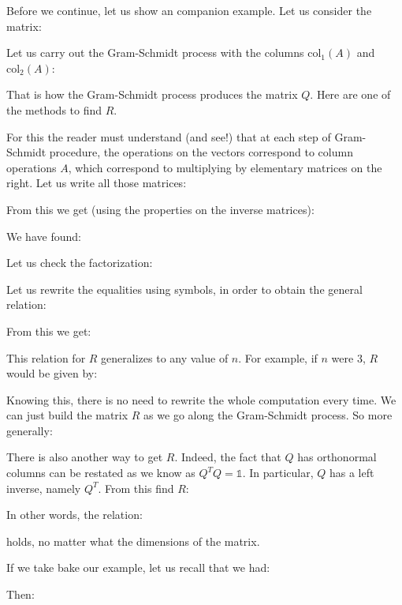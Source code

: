 	Before we continue, let us show an companion example. Let us consider the matrix:
	
	Let us carry out the Gram-Schmidt process with the columns $\text{col}_1(A)$ and $\text{col}_2(A)$:
	
	That is how the Gram-Schmidt process produces the matrix $Q$. Here are one of the methods to find $R$.
	
	For this the reader must understand (and see!) that at each step of Gram-Schmidt procedure, the operations on the vectors correspond to column operations $A$, which correspond to multiplying by elementary matrices on the right. Let us write all those matrices:
	
	From this we get (using the properties on the inverse matrices):
	
	We have found:
	
	Let us check the factorization:
	
	Let us rewrite the equalities using symbols, in order to obtain the general relation:
	
	From this we get:
	
	This relation for $R$ generalizes to any value of $n$. For example, if $n$ were $3$, $R$ would be given
by:
	
	Knowing this, there is no need to rewrite the whole computation every time. We can just
build the matrix $R$ as we go along the Gram-Schmidt process. So more generally:
	

	There is also another way to get $R$.  Indeed, the fact that $Q$ has orthonormal columns can be restated as we know as $Q^TQ=\mathds{1}$. In particular, $Q$ has a left inverse, namely $Q^T$. From this find $R$:
	
	In other words, the relation:
	
	holds, no matter what the dimensions of the matrix.
	
	If we take bake our example, let us recall that we had:
	
	Then:
	
